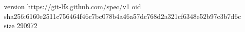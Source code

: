 version https://git-lfs.github.com/spec/v1
oid sha256:6160e2511c756464f46c7bc078b4a46a57dc768d2a321cf6348e52b97c3b7d6c
size 290972
